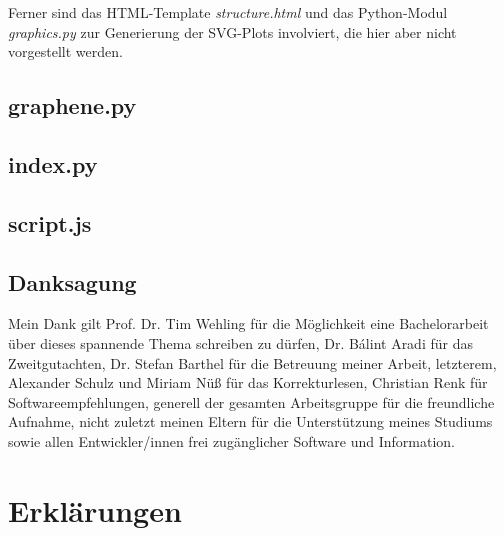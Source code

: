 \documentclass[a4paper, 10pt, twoside, openany]{book} %
\begin{document}
Ferner sind das HTML-Template \emph{structure.html} und das Python-Modul \emph{graphics.py} zur Generierung der SVG-Plots involviert, die hier aber nicht vorgestellt werden.

\section{graphene.py}



\section{index.py}



\section{script.js}



\backmatter

\vspace*{2cm}

\begin{center}
    \begin{minipage}{0.67\textwidth}
        \chapter{Danksagung}

        Mein Dank gilt Prof. Dr. Tim Wehling für die Möglichkeit eine Bachelorarbeit über dieses spannende Thema schreiben zu dürfen, Dr. Bálint Aradi für das Zweitgutachten, Dr. Stefan Barthel für die Betreuung meiner Arbeit, letzterem, Alexander Schulz und Miriam Nüß für das Korrekturlesen, Christian Renk für Softwareempfehlungen, generell der gesamten Arbeitsgruppe für die freundliche Aufnahme, nicht zuletzt meinen Eltern für die Unterstützung meines Studiums sowie allen Entwickler/innen frei zugänglicher Software und Information.
    \end{minipage}
\end{center}

\chapter{Erklärungen}
\end{document}
